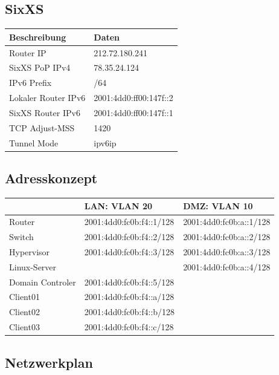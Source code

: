 \subsection{SixXS}

\begin{tabular}{|l|l|}
\hline
Beschreibung			& Daten						\\
\hline
Router IP				& 212.72.180.241		 	\\
SixXS PoP IPv4			& 78.35.24.124			 	\\
IPv6 Prefix				& /64					 	\\	
Lokaler Router	IPv6	& 2001:4dd0:ff00:147f::2 	\\
SixXS Router IPv6 		& 2001:4dd0:ff00:147f::1	\\
TCP Adjust-MSS			& 1420						\\
Tunnel Mode				& ipv6ip					\\
\hline
\end{tabular}

\subsection{Adresskonzept}

\begin{tabular}{|l|l|l|}
\hline
						& LAN: VLAN 20					& DMZ: VLAN 10 \\
\hline
Router					& 2001:4dd0:fc0b:f4::1/128		& 2001:4dd0:fc0b:a::1/128 \\
Switch					& 2001:4dd0:fc0b:f4::2/128		& 2001:4dd0:fc0b:a::2/128 \\
Hypervisor				& 2001:4dd0:fc0b:f4::3/128		& 2001:4dd0:fc0b:a::3/128 \\	
Linux-Server			&								& 2001:4dd0:fc0b:a::4/128 \\
Domain Controler 		& 2001:4dd0:fc0b:f4::5/128		& \\
Client01				& 2001:4dd0:fc0b:f4::a/128		& \\
Client02				& 2001:4dd0:fc0b:f4::b/128		& \\
Client03				& 2001:4dd0:fc0b:f4::c/128		& \\
\hline
\end{tabular}

\subsection{Netzwerkplan}

